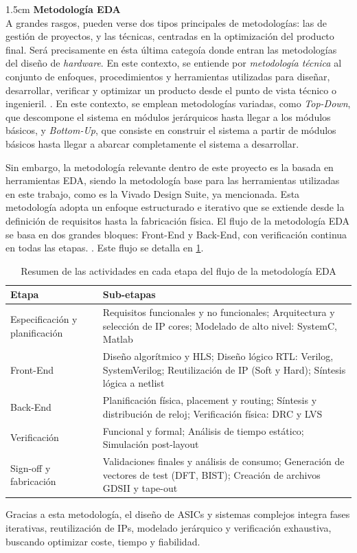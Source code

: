 \begin{adjustwidth}{1.5cm}{}
\textbf{Metodología EDA} \vspace{0.25cm} \\
A grandes rasgos, pueden verse dos tipos principales de metodologías: las de gestión de proyectos, y las técnicas, centradas en la optimización del producto final. Será precisamente en ésta última categoía donde entran las metodologías del diseño de \textit{hardware}. En este contexto, se entiende por \emph{metodología técnica} al conjunto de enfoques, procedimientos y herramientas utilizadas para diseñar, desarrollar, verificar y optimizar un producto desde el punto de vista técnico o ingenieril. \cite{metodologiasHW}. En este contexto, se emplean metodologías variadas, como \textit{Top-Down}, que descompone el sistema en módulos jerárquicos hasta llegar a los módulos básicos, y \textit{Bottom-Up}, que consiste en construir el sistema a partir de módulos básicos hasta llegar a abarcar completamente el sistema a desarrollar. 

Sin embargo, la metodología relevante dentro de este proyecto es la basada en herramientas \ac{EDA}, siendo la metodología base para las herramientas utilizadas en este trabajo, como es la Vivado Design Suite, ya mencionada. Esta metodología adopta un enfoque estructurado e iterativo que se extiende desde la definición de requisitos hasta la fabricación física. El flujo de la metodología EDA se basa en dos grandes bloques: Front-End y Back-End, con verificación continua en todas las etapas. \cite{metodologiaFernando}. Este flujo se detalla en \ref{tbl:flujoEDA}.

\begin{table}[!ht]
\centering
\begin{tabular}{|l|p{9cm}|}
\hline
\textbf{Etapa} & \textbf{Sub-etapas} \\ \hline
Especificación y planificación & Requisitos funcionales y no funcionales; Arquitectura y selección de IP cores; Modelado de alto nivel: SystemC, Matlab \\ \hline
Front-End & Diseño algorítmico y HLS; Diseño lógico RTL: Verilog, SystemVerilog; Reutilización de IP (Soft y Hard); Síntesis lógica a netlist \\ \hline
Back-End & Planificación física, placement y routing; Síntesis y distribución de reloj; Verificación física: DRC y LVS \\ \hline
Verificación & Funcional y formal; Análisis de tiempo estático; Simulación post-layout \\ \hline
Sign-off y fabricación & Validaciones finales y análisis de consumo; Generación de vectores de test (DFT, BIST); Creación de archivos GDSII y tape-out \\ \hline
\end{tabular}
\caption{Resumen de las actividades en cada etapa del flujo de la metodología EDA}
\label{tbl:flujoEDA}
\end{table}

Gracias a esta metodología, el diseño de ASICs y sistemas complejos integra fases iterativas, reutilización de IPs, modelado jerárquico y verificación exhaustiva, buscando optimizar coste, tiempo y fiabilidad. 
\end{adjustwidth}

